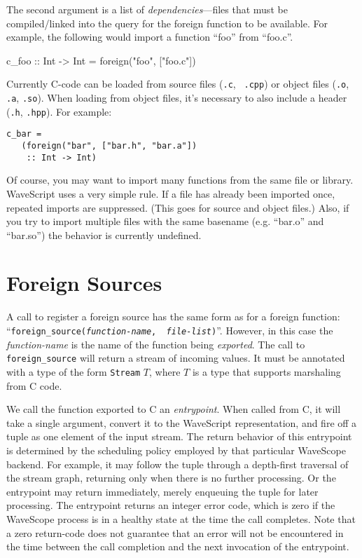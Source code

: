The second argument is a list of {\em dependencies}---files that must
be compiled/linked into the query for the foreign function to be
available.
%
For example, the following would import a function ``foo'' from ``foo.c''.

\begin{wscode}
c\_foo :: Int -> Int = foreign("foo", ["foo.c"])
\end{wscode}


Currently C-code can be loaded from source files ({\tt .c}, {\tt
  .cpp}) or object files ({\tt .o}, {\tt .a}, {\tt .so}).  When
  loading from object files, it's necessary to also include a header
  ({\tt .h}, {\tt .hpp}).  For example:

\begin{verbatim}
c_bar = 
   (foreign("bar", ["bar.h", "bar.a"]) 
    :: Int -> Int)
\end{verbatim}

Of course, you may want to import many functions from the same file or
library.  WaveScript uses a very simple rule.  If a file has already
been imported once, repeated imports are suppressed.  (This goes for
source and object files.)  Also, if you try to import multiple files with
the same basename (e.g. ``bar.o'' and ``bar.so'') the behavior is
currently undefined.





\section{Foreign Sources}

A call to register a foreign source has the same form as for a foreign
function: ``{\tt foreign\_source({\em function-name}, {\em
file-list})}''.  However, in this case the {\em function-name} is the
name of the function being {\em exported}.  The call to {\tt
foreign\_source} will return a stream of incoming values.  It must be
annotated with a type of the form {\tt Stream} $T$, where $T$ is a
type that supports marshaling from C code.

We call the function exported to C an {\em entrypoint}.  When called
from C, it will take a single argument, convert it to the WaveScript
representation, and fire off a tuple as one element of the input
stream.  The return behavior of this entrypoint is determined by the
scheduling policy employed by that particular WaveScope backend.  For
example, it may follow the tuple through a depth-first traversal of
the stream graph, returning only when there is no further processing.
Or the entrypoint may return immediately, merely enqueuing
the tuple for later processing.  The entrypoint returns an integer
error code, which is zero if the WaveScope process is in a
healthy state at the time the call completes.  Note that a zero
return-code does not guarantee that an error will not be encountered
in the time between the call completion and the next invocation of the
entrypoint. 

